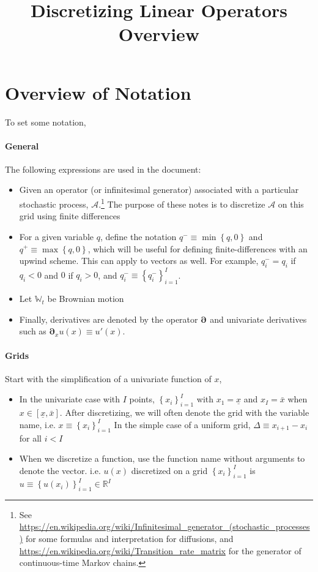 \documentclass[11pt]{article}
\newcommand{\set}[1]{\ensuremath{\left\{{#1}\right\}}}
\newcommand{\R}{\ensuremath{\mathbb{R}}}
\newcommand{\D}[1][]{\ensuremath{\boldsymbol{\partial}_{#1}}}
\newcommand{\A}{\ensuremath{\mathcal{A}}}
\begin{document}
\title{Discretizing Linear Operators Overview}
\author{}
\date{}
\maketitle
\section{Overview of Notation}
To set some notation,
\paragraph{General}

The following expressions are used in the document:
\begin{itemize}
	 \item Given an operator (or infinitesimal generator) associated with a particular stochastic process, $\A$.\footnote{See \url{https://en.wikipedia.org/wiki/Infinitesimal_generator_(stochastic_processes)} for some formulas and interpretation for diffusions, and \url{https://en.wikipedia.org/wiki/Transition_rate_matrix} for the generator of continuous-time Markov chains.}  The purpose of these notes is to discretize $\A$ on this grid using finite differences
	 \item For a given variable $q$, define the notation $q^{-} \equiv \min\set{q,0}$ and $q^{+} \equiv \max\set{q,0}$, which will be useful for defining finite-differences with an upwind scheme.  This can apply to vectors as well. For example, $q_i^{-} = q_i$ if $q_i < 0$ and $0$ if $q_i > 0$, and $q_i^{-} \equiv \set{q^{-}_i}_{i=1}^{I}$.
	 \item Let $\mathbb{W}_t$ be Brownian motion
	 \item Finally, derivatives are denoted by the operator $\D$ and univariate derivatives such as $\D[x]u(x) \equiv u'(x)$.
\end{itemize}

\paragraph{Grids} Start with the simplification of a univariate function of $x$,
\begin{itemize}
	\item In the univariate case with $I$ points, $\set{x_i}_{i=1}^I$ with $x_1 = \underline{x}$ and $x_I = \bar{x}$ when $x \in [\underline{x}, \bar{x}]$.  After discretizing, we will often denote the grid with the variable name, i.e. $x \equiv \set{x_i}_{i=1}^I$
	In the simple case of a uniform grid, $\Delta \equiv x_{i+1} - x_i$ for all $i < I$
	\item When we discretize a function, use the function name without arguments to denote the vector.  i.e. $u(x)$ discretized on a grid $\set{x_i}_{i=1}^{I}$  is $u \equiv \set{u(x_i)}_{i=1}^I \in \R^I$
\end{itemize}
\end{document}
